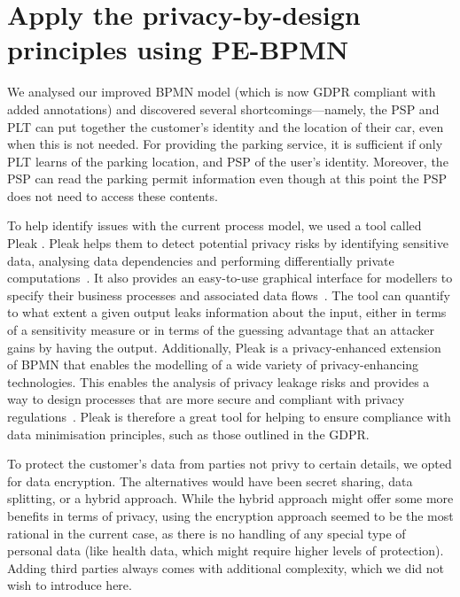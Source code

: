 \section{Apply the privacy-by-design principles using PE-BPMN}

We analysed our improved BPMN model (which is now GDPR compliant with added
annotations) and discovered several shortcomings---namely, the PSP and PLT can
put together the customer's identity and the location of their car, even when
this is not needed. For providing the parking service, it is sufficient if only
PLT learns of the parking location, and PSP of the user's identity. Moreover,
the PSP can read the parking permit information even though at this point the
PSP does not need to access these contents.

To help identify issues with the current process model, we used a tool called
Pleak \cite{pleaktool}. Pleak helps them to detect potential privacy risks by
identifying sensitive data, analysing data dependencies and performing
differentially private
computations~\cite[311-313]{10.1007/978-3-030-16722-6_18}. It also provides an
easy-to-use graphical interface for modellers to specify their business
processes and associated data flows~\cite{pleaktool}. The tool can quantify to
what extent a given output leaks information about the input, either in terms of
a sensitivity measure or in terms of the guessing advantage that an attacker
gains by having the output. Additionally, Pleak is a privacy-enhanced extension
of BPMN that enables the modelling of a wide variety of privacy-enhancing
technologies. This enables the analysis of privacy leakage risks and provides a
way to design processes that are more secure and compliant with privacy
regulations~\cite[1-3]{10.1007/s10009-021-00636-w}. Pleak is therefore a great
tool for helping to ensure compliance with data minimisation principles, such as
those outlined in the GDPR.

To protect the customer's data from parties not privy to certain details, we
opted for data encryption. The alternatives would have been secret sharing, data
splitting, or a hybrid approach. While the hybrid approach might offer some more
benefits in terms of privacy, using the encryption approach seemed to be the 
most rational in the current case, as there is no handling of any special type
of personal data (like health data, which might require higher levels of
protection). Adding third parties always comes with additional complexity, which
we did not wish to introduce here.

